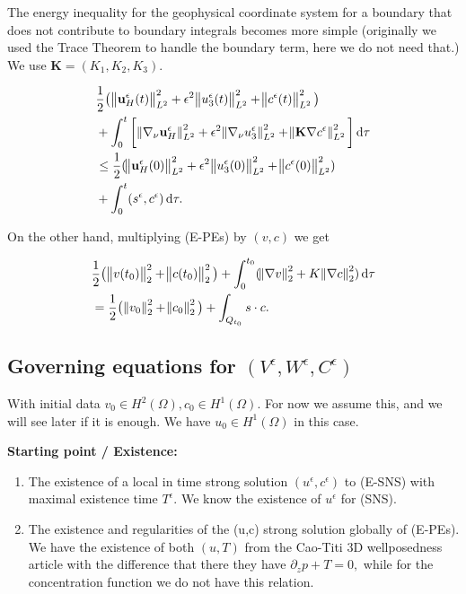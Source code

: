 \documentclass[11pt]{article}
\newcommand*\diff{\mathop{}\!\mathrm{d}}
\begin{document}
The energy inequality for the geophysical coordinate system for a boundary that does not contribute to boundary integrals becomes more simple (originally we used the Trace Theorem to handle the boundary term, here we do not need that.) We use $\mathbf{K} = (K_1, K_2, K_3).$

\begin{equation}
  \begin{split}  
    & \frac{1}{2} \big (\norm{\mathbf{u}_H^\epsilon (t)}_{L^2}^2 + \epsilon ^ 2 \norm{u_3^\epsilon (t)}_{L^2}^2 + \norm{c^\epsilon (t)}_{L^2}^2 \big ) \\
    & + \int_0 ^ t \bigg [\norm{\nabla_\nu \mathbf{u}_H^\epsilon}_{L^2}^2 + \epsilon ^ 2 \norm{\nabla_\nu u_3^\epsilon}_{L^2}^2 + \norm{ \mathbf{K} \nabla c^\epsilon}_{L^2}^2\bigg ] \diff \tau \\
    & \leq \frac{1}{2} (\norm{\mathbf{u}_H^\epsilon (0)}_{L^2}^2 + \epsilon ^ 2 \norm{u_3^\epsilon (0)}_{L^2}^2 + \norm{c^\epsilon (0)}_{L^2}^2) \\
    & + \int_0^t (s^\epsilon,c^\epsilon) \diff \tau. \label{WeakSolEnergyInequality}
  \end{split}
\end{equation}

On the other hand, multiplying (E-PEs) by $(v,c)$ we get

\begin{equation}
  \begin{split}
    & \frac{1}{2} \big ( \norm{v(t_0)}_2^2 + \norm{c(t_0)}_2^2 \big) + \int_0^{t_0} ( \norm{\nabla v}_2^2 + K \norm{\nabla c}_2^2 ) \diff \tau \\
    & = \frac{1}{2} \big ( \norm{v_0}_2^2 + \norm{c_0}_2^2 \big) + \int_{Q_{t_0}} s \cdot c.
  \end{split}
\end{equation}

\subsection{Governing equations for $(V^\epsilon, W^\epsilon, C^\epsilon)$}

With initial data $v_0 \in H^2 (\Omega), c_0 \in H^1(\Omega).$ For now we assume this, and we will see later if it is enough. We have $u_0 \in H^1(\Omega)$ in this case.
  
\textbf{Starting point / Existence:}

\begin{enumerate}
  \item The existence of a local in time strong solution $(u^\epsilon, c^\epsilon)$ to (E-SNS) with maximal existence time $T^\epsilon.$  We know the existence of $u^\epsilon$ for (SNS).
  \item The existence and regularities of the (u,c) strong solution globally of (E-PEs).   We have the existence of both $(u, T)$ from the Cao-Titi 3D wellposedness article with the difference that there they have $\partial_z p + T = 0,$ while for the concentration function we do not have this relation.
\end{enumerate}
  
\end{document}
